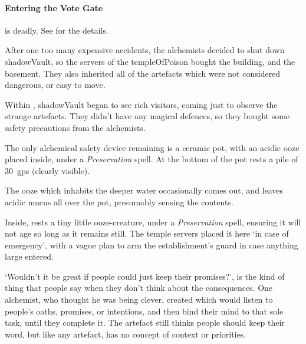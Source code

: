 \begin{multicols}{2}
\showStdSpells[
  \setcounter{diceNo}{0}
]

\paragraph{Entering the Vote Gate}
is deadly.
See  for the details.


\begin{exampletext}
  After one too many expensive accidents, the alchemists decided to shut down \gls{shadowVault}, so the \glspl{server} of the \gls{templeOfPoison} bought the building, and the basement.
  They also inherited all of the \glspl{artefact} which were not considered dangerous, or easy to move.

  Within , \gls{shadowVault} began to see rich visitors, coming just to observe the strange \glspl{artefact}.
  They didn't have any magical defences, so they bought some safety precautions from the alchemists.
\end{exampletext}

The only alchemical safety device remaining is a ceramic pot, with an acidic ooze placed inside, under a \textit{Preservation} spell.
At the bottom of the pot rests a pile of 30~\glspl{gp} (clearly visible).

The ooze which inhabits the deeper water  occasionally comes out, and leaves acidic mucus all over the pot, presumably sensing the contents.

Inside, rests a tiny little ooze-creature, under a \textit{Preservation} spell, ensuring it will not age so long as it remains still.
The temple \glspl{server} placed it here `in case of emergency', with a vague plan to arm the establishment's guard in case anything large entered.

\jelly[1]


\begin{exampletext}
  `Wouldn't it be great if people could just keep their promises?', is the kind of thing that people say when they don't think about the consequences.
  One alchemist, who thought he was being clever, created  which would listen to people's oaths, promises, or intentions, and then bind their mind to that sole task, until they complete it.
  The \gls{artefact} still thinks people should keep their word, but like any \gls{artefact}, has no concept of context or priorities.


\end{exampletext}
\end{multicols}
